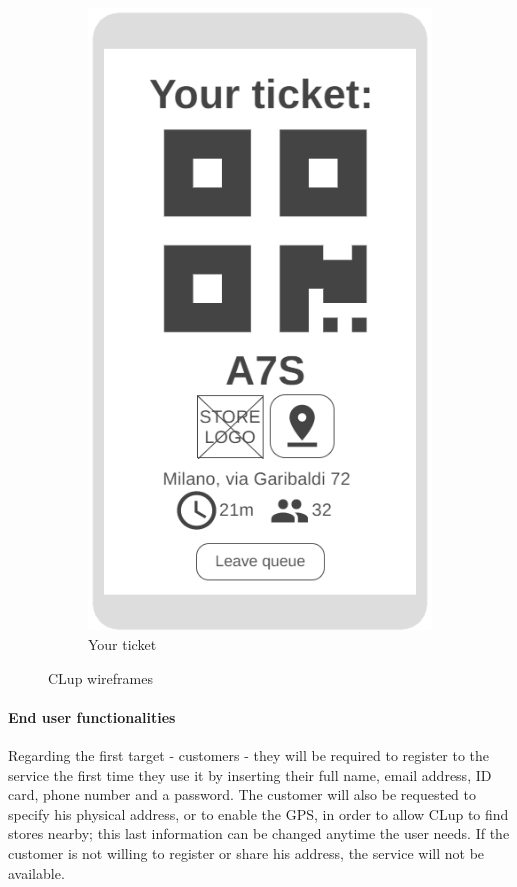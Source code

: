 \begin{figure}[h!]
\begin{subfigure}[b]{0.3\textwidth}
		\includegraphics[width=\linewidth]{../Diagrams/WireframesCLup/Ticket.png}
		\caption{Your ticket}
		\label{fig:WfTicket}
	\end{subfigure}
	\caption{CLup wireframes}
	\label{fig:Wireframes}
\end{figure}
\paragraph{End user functionalities}
Regarding the first target - customers - they will be required to register to the service the first time they use it by inserting their full name, email address, ID card, phone number and a password. The customer will also be requested to specify his physical address, or to enable the GPS, in order to allow CLup to find stores nearby; this last information can be changed anytime the user needs. If the customer is not willing to register or share his address, the service will not be available.

